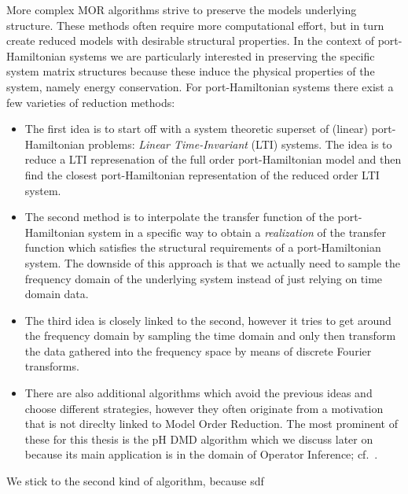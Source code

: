More complex MOR algorithms strive to preserve the models underlying structure.
These methods often require more computational effort, but in turn create reduced models with desirable structural properties.
In the context of port-Hamiltonian systems we are particularly interested in preserving the specific system matrix structures because these induce the physical properties of the system, namely energy conservation.
For port-Hamiltonian systems there exist a few varieties of reduction methods:
\begin{itemize}
    \item The first idea is to start off with a system theoretic superset of (linear) port-Hamiltonian problems: \emph{Linear Time-Invariant} (LTI) systems.
        The idea is to reduce a LTI represenation of the full order port-Hamiltonian model and then find the closest port-Hamiltonian representation of the reduced order LTI system.
    \item The second method is to interpolate the transfer function of the port-Hamiltonian system in a specific way to obtain a \emph{realization} of the transfer function which satisfies the structural requirements of a port-Hamiltonian system.
        The downside of this approach is that we actually need to sample the frequency domain of the underlying system instead of just relying on time domain data.
    \item The third idea is closely linked to the second, however it tries to get around the frequency domain by sampling the time domain and only then transform the data gathered into the frequency space by means of discrete Fourier transforms.
    \item There are also additional algorithms which avoid the previous ideas and choose different strategies, however they often originate from a motivation that is not direclty linked to Model Order Reduction.
        The most prominent of these for this thesis is the pH DMD algorithm which we discuss later on because its main application is in the domain of Operator Inference; cf.~\cite{Morandin2022}.
\end{itemize}
We stick to the second kind of algorithm, because sdf


